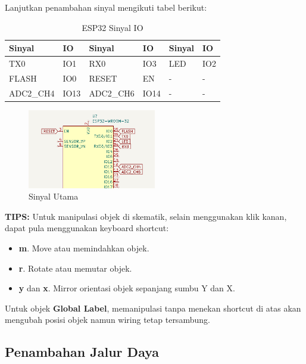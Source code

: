 \documentclass[12pt]{book}
\begin{document}
	\newpage
	Lanjutkan penambahan sinyal mengikuti tabel berikut:

	\begin{table}[h!]
		\begin{center}
			\begin{tabular}{|l|l|l|l|l|l|}
				\toprule
				Sinyal & IO & Sinyal & IO & Sinyal & IO \\
				\midrule
				TX0 & IO1 & RX0 & IO3 & LED & IO2 \\
				FLASH & IO0 & RESET & EN & - & - \\
				ADC2\_CH4 & IO13 & ADC2\_CH6 & IO14 & - & - \\
				\bottomrule
			\end{tabular}
			\caption{ESP32 Sinyal IO}
		\end{center}
	\end{table}

	\begin{figure}[!ht]
		\centering
		\includegraphics[width=0.5\textwidth]{images/sch/sch_7}
		\caption{Sinyal Utama}
	\end{figure}

	\textbf{TIPS:} Untuk manipulasi objek di skematik, selain menggunakan klik kanan, dapat pula menggunakan
	keyboard shortcut:
	\begin{itemize}
		\item \textbf{m}. Move atau memindahkan objek.

		\item \textbf{r}. Rotate atau memutar objek.

		\item \textbf{y} dan \textbf{x}. Mirror orientasi objek sepanjang sumbu Y dan X.
	\end{itemize}

	Untuk objek \textbf{Global Label}, memanipulasi tanpa menekan shortcut di atas akan mengubah posisi objek namun wiring tetap tersambung.

	\subsection{Penambahan Jalur Daya}
\end{document}
